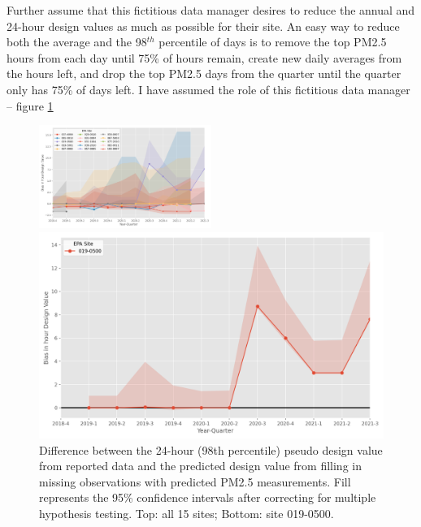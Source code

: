 \documentclass[12pt]{article}
\begin{document}
Further assume that this fictitious data manager desires to reduce the annual and 24-hour design values as much as possible for their site. An easy way to reduce both the average and the 98$^{th}$ percentile of days is to remove the top PM2.5  hours from each day until 75\% of hours remain, create new daily averages from the hours left, and drop the top PM2.5 days from the quarter until the quarter only has 75\% of days left. I have assumed the role of this fictitious data manager -- figure \ref{fig:dv_room_for_manipulation}

\begin{figure}
    \centering
    \includegraphics[width=0.5\textwidth]{output/figures/final_results/DV_hour_plot_all_test_sites_conservative.png}
    \smallskip\par
    \includegraphics[width=\linewidth]{output/figures/final_results/DV_hour_plot_site_019-0500_conservative.png}
    \caption{Difference between the 24-hour (98th percentile) pseudo design value from reported data and the predicted design value from filling in missing observations with predicted PM2.5 measurements. Fill represents the 95\% confidence intervals after correcting for multiple hypothesis testing. Top: all 15 sites; Bottom: site 019-0500.}
    \label{fig:dv_room_for_manipulation}
\end{figure}
\end{document}
